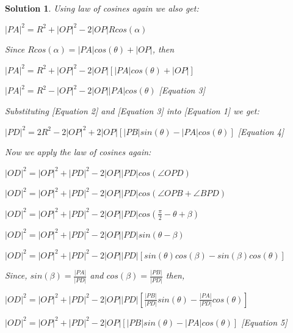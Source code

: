\documentclass[12pt]{article}
\newtheorem*{solution*}{Solution}
\begin{document}
\begin{solution*}
Using law of cosines again we also get:

$\left| PA \right|^{2} =R^{2}+\left| OP \right|^{2} - 2 \left| OP \right| R cos(\alpha)$

Since $R cos(\alpha) = \left| PA \right| cos(\theta) + \left| OP\right|$, then

$\left| PA \right|^{2} =R^{2}+\left| OP \right|^{2} - 2 \left| OP \right| \left[ \left| PA \right| cos(\theta) + \left| OP\right| \right]$

$\left| PA \right|^{2} =R^{2}-\left| OP \right|^{2} - 2 \left| OP \right| \left| PA \right| cos(\theta)$ [Equation 3]

Substituting [Equation 2] and [Equation 3] into [Equation 1] we get:

$\left| PD \right|^{2}=2R^{2}-2\left| OP \right|^{2}+2\left| OP \right| \left[ \left| PB \right| sin(\theta) - \left| PA \right| cos(\theta) \right]$ [Equation 4]

Now we apply the law of cosines again:

$\left| OD \right|^{2}=\left| OP \right|^{2}+\left| PD \right|^{2}-2\left| OP \right| \left| PD \right|cos(\angle OPD)$

$\left| OD \right|^{2}=\left| OP \right|^{2}+\left| PD \right|^{2}-2\left| OP \right| \left| PD \right| cos(\angle OPB+\angle BPD)$

$\left| OD \right|^{2}=\left| OP \right|^{2}+\left| PD \right|^{2}-2\left| OP \right| \left| PD \right| cos \left(\frac{\pi}{2}-\theta+\beta \right)$

$\left| OD \right|^{2}=\left| OP \right|^{2}+\left| PD \right|^{2}-2\left| OP \right| \left| PD \right| sin(\theta-\beta)$

$\left| OD \right|^{2}=\left| OP \right|^{2}+\left| PD \right|^{2}-2\left| OP \right| \left| PD \right| \left[sin(\theta)cos(\beta)-sin(\beta)cos(\theta)  \right]$

Since, $sin(\beta)=\frac{\left| PA \right|}{\left| PD \right|}$ and $cos(\beta)=\frac{\left| PB \right|}{\left| PD \right|}$ then,

$\left| OD \right|^{2}=\left| OP \right|^{2}+\left| PD \right|^{2}-2\left| OP \right| \left| PD \right| \left[\frac{\left| PB \right|}{\left| PD \right|}sin(\theta)-\frac{\left| PA \right|}{\left| PD \right|}cos(\theta)  \right]$

$\left| OD \right|^{2}=\left| OP \right|^{2}+\left| PD \right|^{2}-2\left| OP \right| \left[\left| PB \right|sin(\theta)-\left| PA \right|cos(\theta)  \right]$ [Equation 5]


\end{solution*}
\end{document}

